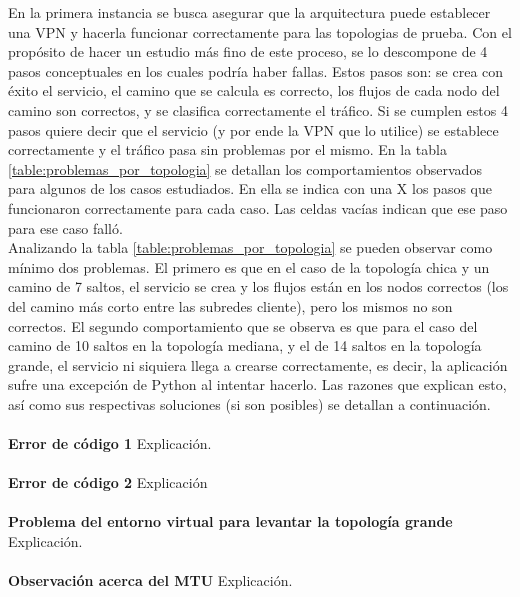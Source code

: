 En la primera instancia se busca asegurar que la arquitectura puede establecer una VPN y hacerla funcionar correctamente para las topologias de prueba. Con el propósito de hacer un estudio más fino de este proceso, se lo descompone de 4 pasos conceptuales en los cuales podría haber fallas. Estos pasos son: se crea con éxito el servicio, el camino que se calcula es correcto, los flujos de cada nodo del camino son correctos, y se clasifica correctamente el tráfico. Si se cumplen estos 4 pasos quiere decir que el servicio (y por ende la VPN que lo utilice) se establece correctamente y el tráfico pasa sin problemas por el mismo. En la tabla \ref{table:problemas_por_topologia} se detallan los comportamientos observados para algunos de los casos estudiados. En ella se indica con una X los pasos que funcionaron correctamente para cada caso. Las celdas vacías indican que ese paso para ese caso falló. \\

Analizando la tabla \ref{table:problemas_por_topologia} se pueden observar como mínimo dos problemas. El primero es que en el caso de la topología chica y un camino de 7 saltos, el servicio se crea y los flujos están en los nodos correctos (los del camino más corto entre las subredes cliente), pero los mismos no son correctos. El segundo comportamiento que se observa es que para el caso del camino de 10 saltos en la topología mediana, y el de 14 saltos en la topología grande, el servicio ni siquiera llega a crearse correctamente, es decir, la aplicación sufre una excepción de Python al intentar hacerlo. Las razones que explican esto, así como sus respectivas soluciones (si son posibles) se detallan a continuación.\\ \\
\textbf{Error de código 1}
Explicación. \\ \\
\textbf{Error de código 2}
Explicación \\ \\
\textbf{Problema del entorno virtual para levantar la topología grande}
Explicación. \\ \\
\textbf{Observación acerca del MTU}
Explicación. \\ \\

